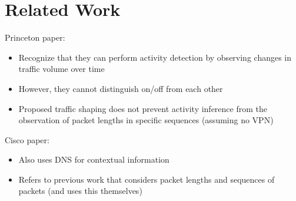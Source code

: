 \section{Related Work}
\label{sect:related-work}

{\color{red}
Princeton paper:
\begin{itemize}
\item Recognize that they can perform activity detection by observing changes in traffic volume over time
\item However, they cannot distinguish on/off from each other
\item Proposed traffic shaping does not prevent activity inference from the observation of packet lengths in specific sequences (assuming no VPN)
\end{itemize}
Cisco paper:
\begin{itemize}
\item Also uses DNS for contextual information
\item Refers to previous work that considers packet lengths and sequences of packets (and uses this themselves)
\end{itemize}
}